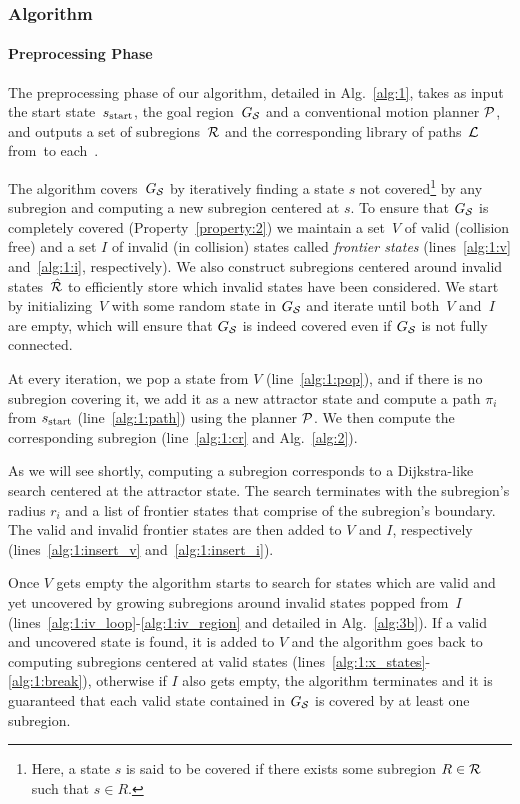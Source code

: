 \documentclass[a4paper,10pt]{article}
\begin{document}
\subsubsection{Algorithm}
\label{subsec:alg}
\paragraph{Preprocessing Phase}
The preprocessing phase of our algorithm, detailed in Alg.~\ref{alg:1}, takes as input the start state~$s_{\textrm{start}}$, the goal region~$G_\mathcal{S}$ and a conventional motion planner $\mathcal{P}$, and outputs a set of subregions~$\mathcal{R}$ and the corresponding library of paths~$\mathcal{L}$ from~\Sstart to each~\sAttract. 

The algorithm covers~$G_\mathcal{S}$ by iteratively finding a state $s$ not covered\footnote{Here, a state $s$ is said to be covered if there exists some subregion $R \in \mathcal{R}$ such that $s \in R$.} by any subregion and computing a new subregion centered at $s$.
To ensure that $G_\mathcal{S}$ is completely covered (Property~\ref{property:2}) we maintain a set~$V$ of valid (collision free) and a set $I$ of invalid (in collision) states called \emph{frontier states} (lines~\ref{alg:1:v} and~\ref{alg:1:i}, respectively).
We also construct subregions centered around invalid states~$\hat{\mathcal{R}}$ to efficiently store which invalid states have been considered.
We start by initializing~$V$ with some random state in $G_\mathcal{S}$ and iterate until both~$V$ and~$I$ are empty, which will ensure that $G_\mathcal{S}$ is indeed covered even if $G_\mathcal{S}$ is not fully connected.

At every iteration, we pop a state from $V$ (line~\ref{alg:1:pop}), and if there is no subregion covering it, we add it as a new attractor state and compute a path $\pi_i$ from $s_{\textrm{start}}$ (line~\ref{alg:1:path}) using the planner $\mathcal{P}$.
We then compute the corresponding subregion (line~\ref{alg:1:cr} and Alg.~\ref{alg:2}).

As we will see shortly, computing a subregion corresponds to a Dijkstra-like search centered at the attractor state.
The search terminates with the subregion's radius $r_i$ and a list of frontier states that comprise of the subregion's boundary.
The valid and invalid frontier states are then added to $V$ and $I$, respectively (lines~\ref{alg:1:insert_v} and~\ref{alg:1:insert_i}).


Once $V$ gets empty the algorithm starts to search for states which are valid and yet uncovered by growing subregions around invalid states popped from~$I$ (lines~\ref{alg:1:iv_loop}-\ref{alg:1:iv_region} and detailed in Alg.~\ref{alg:3b}). If a valid and uncovered state is found, it is added to $V$ and the algorithm goes back to computing subregions centered at valid states (lines~\ref{alg:1:x_states}-\ref{alg:1:break}), otherwise if $I$ also gets empty, the algorithm terminates and it is guaranteed that each valid state contained in $G_\mathcal{S}$ is covered by at least one subregion.
\end{document}

